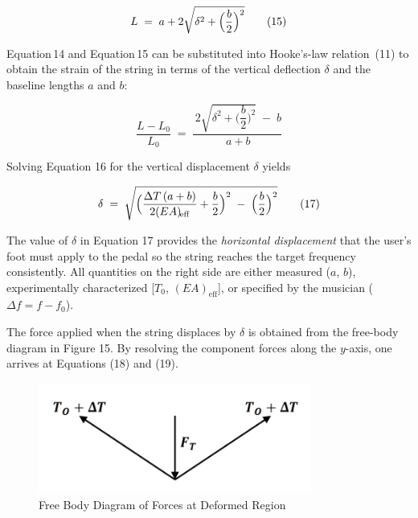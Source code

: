 \documentclass[12pt]{article}
\theoremstyle{definition} %
\theoremstyle{plain} %
\begin{document}
\begin{equation}
  L \;=\; a + 2\sqrt{\delta^{2} + \Bigl(\dfrac{b}{2}\Bigr)^{2}}
  \tag{15}
\end{equation}

Equation\,14 and Equation\,15 can be substituted into Hooke’s-law
relation~(11) to obtain the strain of the string in terms of the vertical
deflection $\delta$ and the baseline lengths $a$ and $b$:

\begin{equation}
  \frac{L - L_0}{L_0}
    \;=\;
  \frac{\,2\sqrt{\delta^{2} + \bigl(\dfrac{b}{2}\bigr)^{2}}\; -\; b}{\,a + b}
  \tag{16}
\end{equation}

Solving Equation 16 for the vertical displacement $\delta$ yields

\begin{equation}
  \delta
    \;=\;
  \sqrt{
    \Bigl(
      \frac{\Delta T\,(a+b)}{2(EA)_{\!\mathrm{eff}}}
      + \frac{b}{2}
    \Bigr)^{2}
    \;-\;
    \Bigl(\frac{b}{2}\Bigr)^{2}}
  \tag{17}
\end{equation}

The value of $\delta$ in Equation 17 provides the \emph{horizontal
displacement} that the user’s foot must apply to the pedal so the string
reaches the target frequency consistently.  All quantities on the right
side are either measured ($a$, $b$), experimentally characterized
[$T_0$, $(EA)_{\!\text{eff}}$], or specified by the musician
($\Delta f = f - f_0$).

The force applied when the string displaces by $\delta$ is obtained
from the free-body diagram in Figure 15.  
By resolving the component forces along the $y$-axis, one arrives at
Equations (18) and (19).

\begin{figure}[htbp]
  \centering
  \includegraphics[width=0.8\textwidth]{classes/Mathematics-of-Guitar-Strings/06-10/fgs/fig15.png}
  \caption{Free Body Diagram of Forces at Deformed Region}
  \label{fig:}
\end{figure}
\end{document}
